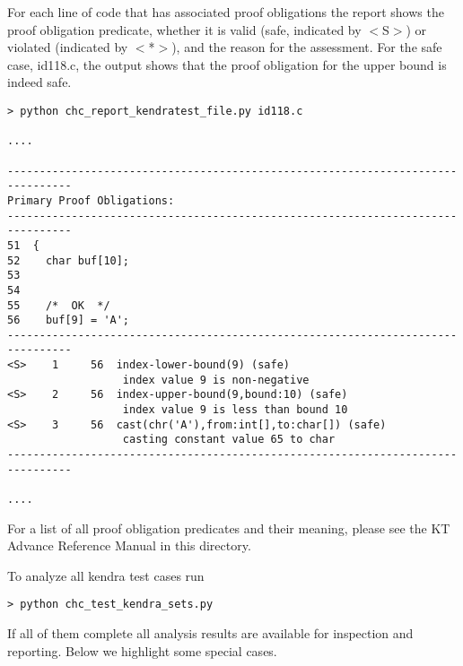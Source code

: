 \documentclass[11pt]{article}
\begin{document}
For each line of code that has associated proof obligations the report shows the
proof obligation predicate, whether it is valid (safe, indicated by $<$S$>$) or 
violated (indicated by $<$*$>$), and the reason for the assessment. For the safe
case, id118.c, the output shows that the proof obligation for the upper bound is
indeed safe.
\begin{small}
\begin{verbatim}
> python chc_report_kendratest_file.py id118.c

....

--------------------------------------------------------------------------------
Primary Proof Obligations:
--------------------------------------------------------------------------------
51  {
52    char buf[10];
53
54
55    /*  OK  */
56    buf[9] = 'A';
--------------------------------------------------------------------------------
<S>    1     56  index-lower-bound(9) (safe)
                  index value 9 is non-negative
<S>    2     56  index-upper-bound(9,bound:10) (safe)
                  index value 9 is less than bound 10
<S>    3     56  cast(chr('A'),from:int[],to:char[]) (safe)
                  casting constant value 65 to char
--------------------------------------------------------------------------------

....
\end{verbatim}
\end{small}




For a list of
all proof obligation predicates and their meaning, please see the KT Advance
Reference Manual in this directory.

To analyze all kendra test cases run
\begin{verbatim}
> python chc_test_kendra_sets.py
\end{verbatim}
If all of them complete all analysis results are available for inspection and reporting.
Below we highlight some special cases.
\end{document}
